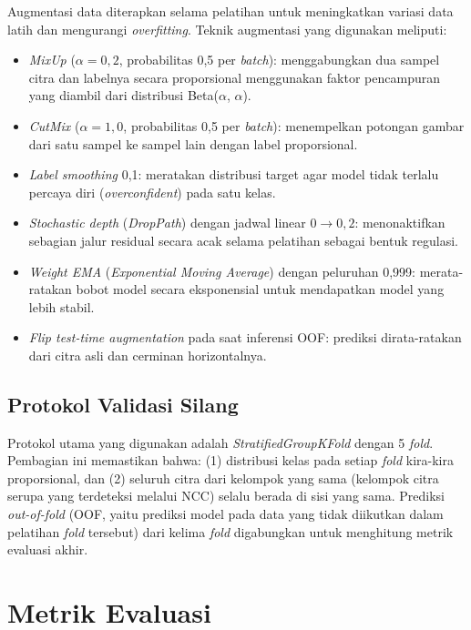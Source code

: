 Augmentasi data diterapkan selama pelatihan untuk meningkatkan variasi data latih dan
mengurangi \textit{overfitting}. Teknik augmentasi yang digunakan meliputi:
\begin{itemize}
    \item \textit{MixUp} \citep{Zhang2018} ($\alpha = 0{,}2$, probabilitas 0,5 per \textit{batch}):
    menggabungkan dua sampel citra dan labelnya secara proporsional menggunakan faktor pencampuran yang diambil dari distribusi Beta($\alpha$, $\alpha$).
    \item \textit{CutMix} \citep{Yun2019} ($\alpha = 1{,}0$, probabilitas 0,5 per \textit{batch}):
    menempelkan potongan gambar dari satu sampel ke sampel lain dengan label proporsional.
    \item \textit{Label smoothing} 0,1: meratakan distribusi target agar model tidak terlalu
    percaya diri (\textit{overconfident}) pada satu kelas.
    \item \textit{Stochastic depth} (\textit{DropPath}) \citep{Huang2016} dengan jadwal
    linear $0 \rightarrow 0{,}2$: menonaktifkan sebagian jalur residual secara acak
    selama pelatihan sebagai bentuk regulasi.
    \item \textit{Weight EMA} (\textit{Exponential Moving Average}) dengan peluruhan 0,999:
    merata-ratakan bobot model secara eksponensial untuk mendapatkan model yang lebih stabil.
    \item \textit{Flip test-time augmentation} pada saat inferensi OOF: prediksi dirata-ratakan
    dari citra asli dan cerminan horizontalnya.
\end{itemize}

\subsection{Protokol Validasi Silang}

Protokol utama yang digunakan adalah \textit{StratifiedGroupKFold} dengan 5 \textit{fold}.
Pembagian ini memastikan bahwa: (1) distribusi kelas pada setiap \textit{fold} kira-kira
proporsional, dan (2) seluruh citra dari kelompok yang sama (kelompok citra serupa yang
terdeteksi melalui NCC) selalu berada di sisi yang sama. Prediksi \textit{out-of-fold} (OOF, yaitu prediksi model pada data yang tidak diikutkan dalam pelatihan \textit{fold} tersebut) dari kelima \textit{fold} digabungkan untuk menghitung metrik evaluasi akhir.

\section{Metrik Evaluasi}

